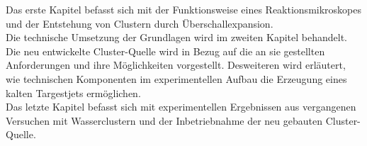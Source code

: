 Das erste Kapitel befasst sich mit der Funktionsweise eines Reaktionsmikroskopes und der Entstehung von Clustern durch Überschallexpansion. \\
Die technische Umsetzung der Grundlagen wird im zweiten Kapitel behandelt. Die neu entwickelte Cluster-Quelle wird in Bezug auf die an sie gestellten Anforderungen und ihre Möglichkeiten vorgestellt. Desweiteren wird erläutert, wie technischen Komponenten im experimentellen Aufbau die Erzeugung eines kalten Targestjets ermöglichen.\\
Das letzte Kapitel befasst sich mit experimentellen Ergebnissen aus vergangenen Versuchen mit Wasserclustern und der Inbetriebnahme der neu gebauten Cluster-Quelle.